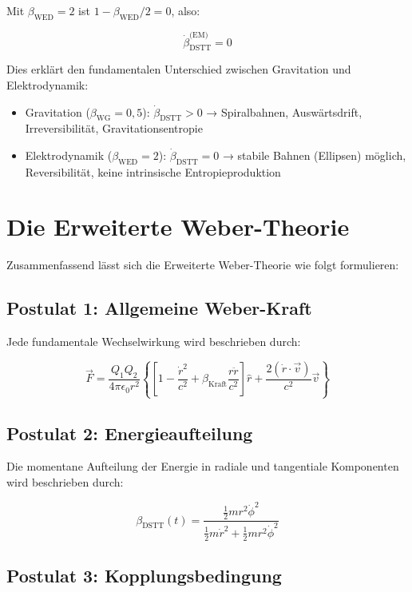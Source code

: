 Mit \(\beta_{\text{WED}} = 2\) ist \(1 - \beta_{\text{WED}}/2 = 0\), also:

\[
\dot{\beta}_{\text{DSTT}}^{\text{(EM)}} = 0
\]

Dies erklärt den fundamentalen Unterschied zwischen Gravitation und Elektrodynamik:

\begin{itemize}
    \item Gravitation (\(\beta_{\text{WG}} = 0,5\)): \(\dot{\beta}_{\text{DSTT}} > 0\) → Spiralbahnen, Auswärtsdrift, Irreversibilität, Gravitationsentropie
    \item Elektrodynamik (\(\beta_{\text{WED}} = 2\)): \(\dot{\beta}_{\text{DSTT}} = 0\) → stabile Bahnen (Ellipsen) möglich, Reversibilität, keine intrinsische Entropieproduktion
\end{itemize}

\section{Die Erweiterte Weber-Theorie}
\label{sec:erweiterte_weber}

Zusammenfassend lässt sich die Erweiterte Weber-Theorie wie folgt formulieren:

\subsection{Postulat 1: Allgemeine Weber-Kraft}
\label{sec:postulat1}

Jede fundamentale Wechselwirkung wird beschrieben durch:

\[
\vec{F} = \frac{Q_1 Q_2}{4\pi \epsilon_0 r^2} \left\{ \left[ 1 - \frac{\dot{r}^2}{c^2} + \beta_{\text{Kraft}} \frac{r \ddot{r}}{c^2} \right] \hat{r} + \frac{2(\dot{r} \cdot \vec{v})}{c^2} \vec{v} \right\}
\]

\subsection{Postulat 2: Energieaufteilung}
\label{sec:postulat2}

Die momentane Aufteilung der Energie in radiale und tangentiale Komponenten wird beschrieben durch:

\[
\beta_{\text{DSTT}}(t) = \frac{\frac{1}{2}mr^2\dot{\phi}^2}{\frac{1}{2}m\dot{r}^2 + \frac{1}{2}mr^2\dot{\phi}^2}
\]

\subsection{Postulat 3: Kopplungsbedingung}
\label{sec:postulat3}

